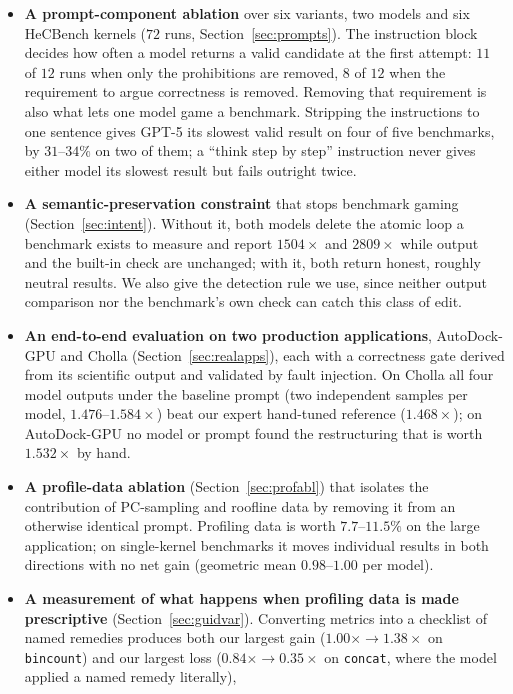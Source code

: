 \begin{itemize}\itemsep2pt
\item \textbf{A prompt-component ablation} over six variants, two models and six HeCBench kernels
  ($72$ runs, Section~\ref{sec:prompts}). The instruction block decides how often a model returns a
  valid candidate at the first attempt: $11$ of $12$ runs when only the prohibitions are removed,
  $8$ of $12$ when the requirement to argue correctness is removed. Removing that requirement is also
  what lets one model game a benchmark. Stripping the instructions to one sentence gives GPT-5 its
  slowest valid result on four of five benchmarks, by $31$--$34\%$ on two of them; a ``think step by
  step'' instruction never gives either model its slowest result but fails outright twice.
\item \textbf{A semantic-preservation constraint} that stops benchmark gaming
  (Section~\ref{sec:intent}). Without it, both models delete the atomic loop a benchmark exists to
  measure and report $1504\times$ and $2809\times$ while output and the built-in check are unchanged;
  with it, both return honest, roughly neutral results. We also give the detection rule we use, since
  neither output comparison nor the benchmark's own check can catch this class of edit.
\item \textbf{An end-to-end evaluation on two production applications}, AutoDock-GPU and Cholla
  (Section~\ref{sec:realapps}), each with a correctness gate derived from its scientific output and
  validated by fault injection. On Cholla all four model outputs under the baseline prompt (two
  independent samples per model, $1.476$--$1.584\times$) beat our expert hand-tuned reference
  ($1.468\times$); on AutoDock-GPU no model or prompt found the restructuring that is worth
  $1.532\times$ by hand.
\item \textbf{A profile-data ablation} (Section~\ref{sec:profabl}) that isolates the contribution of
  PC-sampling and roofline data by removing it from an otherwise identical prompt. Profiling data is
  worth $7.7$--$11.5\%$ on the large application; on single-kernel benchmarks it moves individual
  results in both directions with no net gain (geometric mean $0.98$--$1.00$ per model).
\item \textbf{A measurement of what happens when profiling data is made prescriptive}
  (Section~\ref{sec:guidvar}). Converting metrics into a checklist of named remedies produces both our
  largest gain ($1.00\times \to 1.38\times$ on \texttt{bincount}) and our largest loss
  ($0.84\times \to 0.35\times$ on \texttt{concat}, where the model applied a named remedy literally),

\end{itemize}
